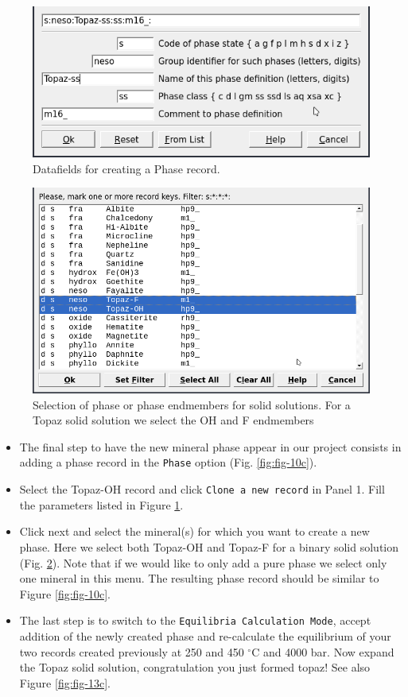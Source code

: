 \documentclass[
]{book}
\begin{document}
\begin{figure}
\includegraphics[width=0.7\linewidth]{figures/module3/fig-11} \caption{Datafields for creating a Phase record.}\label{fig:fig-11c}
\end{figure}

\begin{figure}
\includegraphics[width=0.7\linewidth]{figures/module3/fig-12} \caption{Selection of phase or phase endmembers for solid solutions. For a Topaz solid solution we select the OH and F endmembers}\label{fig:fig-12c}
\end{figure}

\begin{itemize}
\item
  The final step to have the new mineral phase appear in our project consists in adding a phase record in the \texttt{Phase} option (Fig. \ref{fig:fig-10c}).
\item
  Select the Topaz-OH record and click \texttt{Clone\ a\ new\ record} in Panel 1. Fill the parameters listed in Figure \ref{fig:fig-11c}.
\item
  Click next and select the mineral(s) for which you want to create a new phase. Here we select both Topaz-OH and Topaz-F for a binary solid solution (Fig. \ref{fig:fig-12c}). Note that if we would like to only add a pure phase we select only one mineral in this menu. The resulting phase record should be similar to Figure \ref{fig:fig-10c}.
\item
  The last step is to switch to the \texttt{Equilibria\ Calculation\ Mode}, accept addition of the newly created phase and re-calculate the equilibrium of your two records created previously at 250 and 450 \(^\circ\)C and 4000 bar. Now expand the Topaz solid solution, congratulation you just formed topaz! See also Figure \ref{fig:fig-13c}.
\end{itemize}
\end{document}

